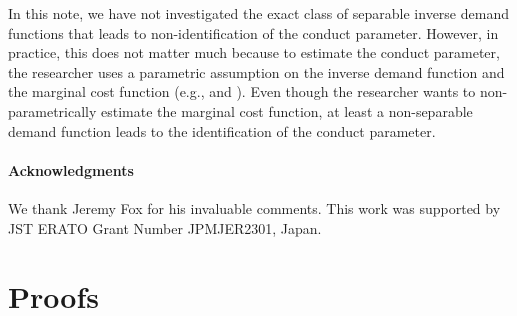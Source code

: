 \documentclass[11pt, a4paper]{article}
\theoremstyle{remark}
\begin{document}
In this note, we have not investigated the exact class of separable inverse demand functions that leads to non-identification of the conduct parameter.
However, in practice, this does not matter much because to estimate the conduct parameter, the researcher uses a parametric assumption on the inverse demand function and the marginal cost function (e.g., \citet{okazaki2022excess} and \citet{matsumura2024loglinear}).
Even though the researcher wants to non-parametrically estimate the marginal cost function, at least a non-separable demand function leads to the identification of the conduct parameter.

\paragraph{Acknowledgments}
We thank Jeremy Fox for his invaluable comments.
This work was supported by JST ERATO Grant Number JPMJER2301, Japan.  


\newpage



\appendix

\section{Proofs}\label{appendix:proof}
\end{document}
